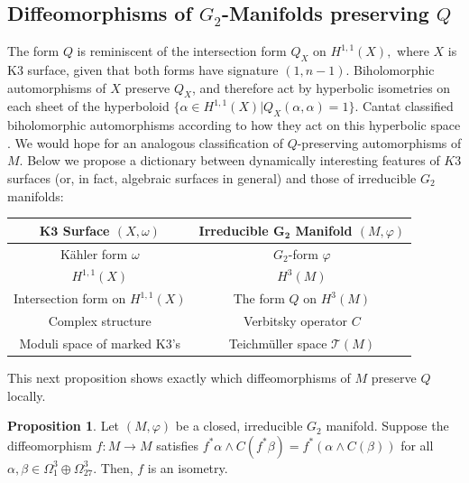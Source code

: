 \documentclass{amsart}
\theoremstyle{theorem}
\theoremstyle{definition}
\theoremstyle{definition}
\theoremstyle{definition}
\theoremstyle{theorem}
\theoremstyle{theorem}
\newtheorem{proposition}[theorem]{Proposition}
\theoremstyle{theorem}
\theoremstyle{corollary}
\theoremstyle{question}
\theoremstyle{remark}
\begin{document}
\subsection{Diffeomorphisms of $G_2$-Manifolds preserving $Q$} The form $Q$ is reminiscent of the intersection form $Q_X$ on $H^{1,1}(X),$ where $X$ is K3 surface, given that both forms have signature $(1, n-1).$ Biholomorphic automorphisms of $X$ preserve $Q_X$, and therefore act by hyperbolic isometries on each sheet of the hyperboloid $\{\alpha\in H^{1,1}(X) | Q_X(\alpha, \alpha) = 1\}$. Cantat classified biholomorphic automorphisms according to how they act on this hyperbolic space \cite{Cantat}. We would hope for an analogous classification of $Q$-preserving automorphisms of $M.$ Below we propose a dictionary between dynamically interesting features of $K3$ surfaces (or, in fact, algebraic surfaces in general) and those of irreducible $G_2$ manifolds:

\medskip
\bgroup
\def\arraystretch{1.25}
\begin{tabular}{ c | c }
$\mathbf{K3}$ \textbf{Surface} $(X, \omega)$ & \textbf{Irreducible} $\mathbf{G_2}$ \textbf{Manifold} $(M, \varphi)$ \\
\hline
K\"{a}hler form $\omega$ & $G_2$-form $\varphi$ \\
\hline
$H^{1,1}(X)$ & $H^3(M)$ \\
\hline
Intersection form on $H^{1,1}(X)$ & The form $Q$ on $H^3(M)$ \\
\hline
Complex structure & Verbitsky operator $C$ \\
\hline
Moduli space of marked K3's & Teichm\"uller space $\mathcal{T}(M)$ \\
\end{tabular}
\egroup
\medskip

This next proposition shows exactly which diffeomorphisms of $M$ preserve $Q$ locally. 

\begin{proposition}
    Let $(M,\varphi)$ be a closed, irreducible $G_2$ manifold. Suppose the diffeomorphism $f:M\to M$ satisfies $f^*\alpha\wedge C(f^*\beta) = f^*(\alpha\wedge C(\beta))$ for all $\alpha, \beta\in\Omega^3_1\oplus\Omega^3_{27}.$ Then, $f$ is an isometry.
\end{proposition}
\end{document}
